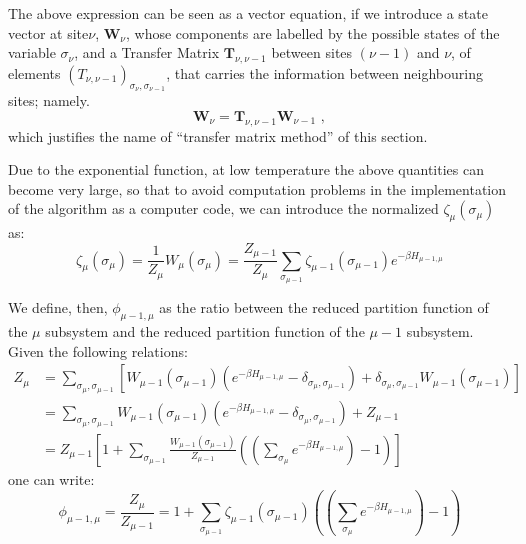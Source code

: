 The above expression can be seen as a vector equation, if we introduce a state
vector at site$\nu$, $\mathbf{W}_\nu$, whose components are labelled by the
possible states of the variable $\sigma_\nu$, and a Transfer Matrix
$\mathbf{T}_{\nu,\nu-1}$ between sites $(\nu-1)$ and  $\nu$, of elements
$(T_{\nu,\nu-1})_{\sigma_\nu,\sigma_{\nu-1}}$, that carries the information
between neighbouring sites; namely.
\begin{equation*}
 \mathbf{W}_\nu={\mathbf T}_{\nu,\nu-1} \mathbf{W}_{\nu-1}\,\,,
\end{equation*}
which justifies the name of ``transfer matrix method'' of this section.

 
Due to the exponential function, at low temperature the above quantities can
become very large, so that to avoid computation problems in the implementation
of the algorithm as a computer code,
we can introduce the normalized %
$\zeta_\mu(\sigma_\mu)$ as:
\begin{equation}
\zeta_\mu(\sigma_\mu)=
\frac1{Z_\mu}W_\mu(\sigma_\mu)=\frac{Z_{\mu-1}}{Z_\mu}\sum_{\sigma_{\mu-1}}
\zeta_{\mu-1}(\sigma_{\mu-1}) e^{-\beta H_{\mu-1,\mu}}
\label{zeta_mu}
\end{equation}

We define, then, $\phi_{\mu-1,\mu}$ as the ratio between the reduced partition function
of the $\mu$ subsystem and the reduced partition function of the $\mu-1$
subsystem.
Given the following relations:
\begin{align}
Z_\mu &=
\sum_{\sigma_\mu,\sigma_{\mu-1}} \left[
W_{\mu-1}(\sigma_{\mu-1}) \left( e^{-\beta
H_{\mu-1,\mu}}-\delta_{\sigma_\mu,\sigma_{\mu-1}}\right)+
\delta_{\sigma_\mu,\sigma_{\mu-1}} W_{\mu-1}(\sigma_{\mu-1}) \right]\nonumber\\
&=
\sum_{\sigma_\mu,\sigma_{\mu-1}}
W_{\mu-1}(\sigma_{\mu-1}) \left(
e^{-\beta H_{\mu-1,\mu}}-\delta_{\sigma_\mu,\sigma_{\mu-1}}\right)+
Z_{\mu-1}\nonumber\\
&= 
Z_{\mu-1} \left[ 1+\sum_{\sigma_{\mu-1}}
\frac{W_{\mu-1}(\sigma_{\mu-1})}{Z_{\mu-1}} \left(\left(
\sum_{\sigma_\mu}e^{-\beta H_{\mu-1,\mu}}\right)
-1\right)\right]
\label{z_mu}
\end{align}
one can write:
\begin{equation}
\phi_{\mu-1,\mu}=
\frac{Z_\mu}{Z_{\mu-1}}=
1+\sum_{\sigma_{\mu-1}}
\zeta_{\mu-1}(\sigma_{\mu-1})
\left(\left(
\sum_{\sigma_\mu}e^{-\beta H_{\mu-1,\mu}}\right)
-1\right)
\end{equation}



